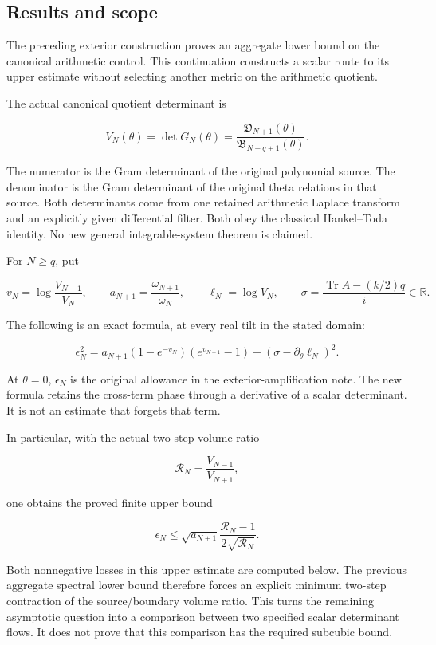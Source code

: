 



\subsection{Results and scope}\label{toda_volume:results-and-scope}

The preceding exterior construction proves an aggregate lower bound on
the canonical arithmetic control. This continuation constructs a scalar
route to its upper estimate without selecting another metric on the
arithmetic quotient.

The actual canonical quotient determinant is

\[
V_N(\theta)=\det G_N(\theta)
=\frac{\mathfrak D_{N+1}(\theta)}{\mathfrak B_{N-q+1}(\theta)}.
\tag{1}
\]

The numerator is the Gram determinant of the original polynomial source.
The denominator is the Gram determinant of the original theta relations
in that source. Both determinants come from one retained arithmetic
Laplace transform and an explicitly given differential filter. Both obey
the classical Hankel--Toda identity. No new general integrable-system
theorem is claimed.

For \(N\ge q\), put

\[
 v_N=\log\frac{V_{N-1}}{V_N},\qquad
 a_{N+1}=\frac{\omega_{N+1}}{\omega_N},\qquad
 \ell_N=\log V_N,\qquad
 \sigma=\frac{\operatorname{Tr}A-(k/2)q}{i}\in\mathbb R.
\]

The following is an exact formula, at every real tilt in the stated
domain:

\[
\boxed{
\epsilon_N^2
=a_{N+1}(1-e^{-v_N})(e^{v_{N+1}}-1)
-(\sigma-\partial_\theta\ell_N)^2.
}
\tag{2}
\]

At \(\theta=0\), \(\epsilon_N\) is the original allowance in the
exterior-amplification note. The new formula retains the cross-term
phase through a derivative of a scalar determinant. It is not an
estimate that forgets that term.

In particular, with the actual two-step volume ratio

\[
\mathcal R_N=\frac{V_{N-1}}{V_{N+1}},
\]

one obtains the proved finite upper bound

\[
\boxed{
\epsilon_N\le
\sqrt{a_{N+1}}\frac{\mathcal R_N-1}{2\sqrt{\mathcal R_N}}.
}
\tag{3}
\]

Both nonnegative losses in this upper estimate are computed below. The
previous aggregate spectral lower bound therefore forces an explicit
minimum two-step contraction of the source/boundary volume ratio. This
turns the remaining asymptotic question into a comparison between two
specified scalar determinant flows. It does not prove that this
comparison has the required subcubic bound.

